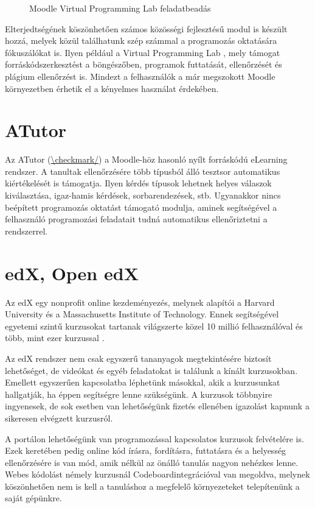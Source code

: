 \begin{figure}[h]
    \centering
    \caption{Moodle Virtual Programming Lab feladatbeadás}
    \label{fig:moodle_vpl}
\end{figure}

Elterjedtségének köszönhetően számos közösségi fejlesztésű modul is készült hozzá, melyek közül találhatunk szép számmal a programozás oktatására fókuszálókat is. Ilyen például a Virtual Programming Lab \cite{VPL} \cite{VPLJournal}, mely támogat forráskódszerkesztést a böngészőben, programok futtatását, ellenőrzését és plágium ellenőrzést is. Mindezt a felhasználók a már megszokott Moodle környezetben érhetik el a kényelmes használat érdekében.

\section{ATutor}

Az ATutor (\url{\checkmark/}) a Moodle-höz hasonló nyílt forráskódú eLearning rendszer. A tanultak ellenőrzésére több típusból álló tesztsor automatikus kiértékelését is támogatja. Ilyen kérdés típusok lehetnek helyes válaszok kiválasztása, igaz-hamis kérdések, sorbarendezések, stb. Ugyanakkor nincs beépített programozás oktatást támogató modulja, aminek segítségével a felhasználó programozási feladatait tudná automatikus ellenőriztetni a rendszerrel.

\section{edX, Open edX}
Az edX \cite{EDXAbout} egy nonprofit online kezdeményezés, melynek alapítói a Harvard University és a Massachusetts Institute of Technology. Ennek segítségével egyetemi szintű kurzusokat tartanak világszerte közel 10 millió felhasználóval és több, mint ezer kurzussal \cite{EDXReview}.

Az edX rendszer nem csak egyszerű tananyagok megtekintésére biztosít lehetőséget, de videókat és egyéb feladatokat is találunk a kínált kurzusokban. Emellett egyszerűen kapcsolatba léphetünk másokkal, akik a kurzusunkat hallgatják, ha éppen segítségre lenne szükségünk. A kurzusok többnyire ingyenesek, de sok esetben van lehetőségünk fizetés ellenében igazolást kapnunk a sikeresen elvégzett kurzusról.

A portálon lehetőségünk van programozással kapcsolatos kurzusok felvételére is. Ezek keretében pedig online kód írásra, fordításra, futtatásra és a helyesség ellenőrzésére is van mód, amik nélkül az önálló tanulás nagyon nehézkes lenne. Webes kódolást némely kurzusnál Codeboard\footnotemark integrációval van megoldva, melynek köszönhetően nem is kell a tanuláshoz a megfelelő környezeteket telepítenünk a saját gépünkre.

